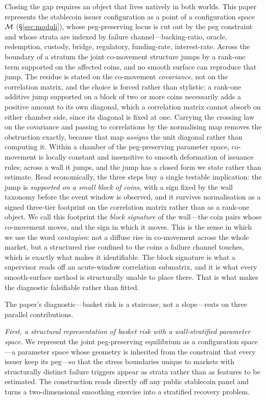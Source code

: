 Closing the gap requires an object that lives natively in both worlds. This paper represents the stablecoin issuer configuration as a point of a configuration space $\mathcal{M}$ (\S\ref{sec:moduli}), whose peg-preserving locus is cut out by the peg constraint and whose strata are indexed by failure channel---backing-ratio, oracle, redemption, custody, bridge, regulatory, funding-rate, interest-rate. Across the boundary of a stratum the joint co-movement structure jumps by a rank-one term supported on the affected coins, and no smooth surface can reproduce that jump. The residue is stated on the co-movement \emph{covariance}, not on the correlation matrix, and the choice is forced rather than stylistic: a rank-one additive jump supported on a block of two or more coins necessarily adds a positive amount to its own diagonal, which a correlation matrix cannot absorb on either chamber side, since its diagonal is fixed at one. Carrying the crossing law on the covariance and passing to correlations by the normalising map removes the obstruction exactly, because that map \emph{assigns} the unit diagonal rather than computing it. Within a chamber of the peg-preserving parameter space, co-movement is locally constant and insensitive to smooth deformation of issuance rules; across a wall it jumps, and the jump has a closed form we state rather than estimate. Read economically, the three steps buy a single testable implication: the jump is \emph{supported on a small block of coins}, with a sign fixed by the wall taxonomy before the event window is observed, and it survives normalisation as a signed three-tier footprint on the correlation matrix rather than as a rank-one object. We call this footprint the \emph{block signature} of the wall---the coin pairs whose co-movement moves, and the sign in which it moves. This is the sense in which we use the word \emph{contagion}: not a diffuse rise in co-movement across the whole market, but a structured rise confined to the coins a failure channel touches, which is exactly what makes it identifiable. The block signature is what a supervisor reads off an acute-window correlation submatrix, and it is what every smooth-surface method is structurally unable to place there. That is what makes the diagnostic falsifiable rather than fitted.

The paper's diagnostic---basket risk is a staircase, not a slope---rests on three parallel contributions.

\textit{First, a structural representation of basket risk with a wall-stratified parameter space.} We represent the joint peg-preserving equilibrium as a configuration space---a parameter space whose geometry is inherited from the constraint that every issuer keep its peg---so that the stress boundaries unique to markets with structurally distinct failure triggers appear as strata rather than as features to be estimated. The construction reads directly off any public stablecoin panel and turns a two-dimensional smoothing exercise into a stratified recovery problem.

